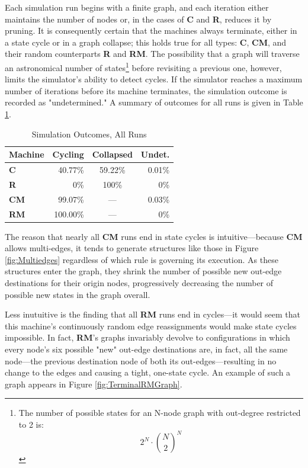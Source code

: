 \documentclass{tufte-handout}
\begin{document}
Each simulation run begins with a finite graph, and each iteration
either maintains the number of nodes or, in the cases of \textbf{C} and \textbf{R},
reduces it by pruning.  It is consequently certain that the machines always terminate,
either in a state cycle or in a graph collapse; this holds true
for all types: \textbf{C}, \textbf{CM}, and their random counterparts \textbf{R} and \textbf{RM}.
The possibility that a graph will traverse an astronomical number
of states\footnote{The number of possible states for an N-node graph with
out-degree restricted to 2 is:
\[
2^N\cdot\binom{N}{2}^N
\]
}
before revisiting a previous one, however, limits the simulator's ability to
detect cycles. If the simulator reaches a maximum number of iterations
before its machine terminates, the simulation outcome is recorded as "undetermined."
A summary of outcomes for all runs is given in Table \ref{tab:Tab2}.

\begin{table}
\caption{Simulation Outcomes, All Runs}
\centering
\begin{tabular}{lrcr}
\toprule
Machine & Cycling & Collapsed & Undet. \\
\midrule
\textbf{C} & 40.77\% & 59.22\% & 0.01\% \\
\textbf{R} & 0\% & 100\% & 0\% \\
\cmidrule(r){2-4}
\textbf{CM} & 99.07\% & --- & 0.03\% \\
\textbf{RM} & 100.00\% & --- & 0\% \\
\bottomrule
\end{tabular}
\label{tab:Tab2}
\end{table}
\vspace{3mm}

The reason that nearly all \textbf{CM} runs end in state cycles is
intuitive---because \textbf{CM} allows multi-edges, it tends to generate structures
like those in Figure \ref{fig:Multiedges} regardless of which rule is governing its execution.
As these structures enter the graph, they 
shrink the number of possible new out-edge destinations for their origin nodes,
progressively decreasing the number of possible new states in the graph overall.

Less inutuitive is the finding that all \textbf{RM} runs end in cycles---it would
seem that this machine's continuously random edge reassignments would
make state cycles impossible. In fact, \textbf{RM}'s graphs invariably devolve
to configurations in which every node's six possible "new" out-edge destinations
are, in fact, all the same node---the previous destination node of both its
out-edges---resulting in no change to the edges and causing a tight, one-state cycle.
An example of such a graph appears in Figure \ref{fig:TerminalRMGraph}.
\end{document}
